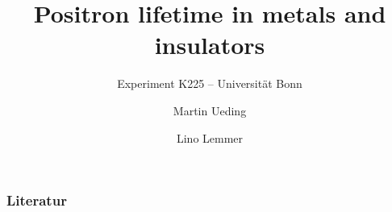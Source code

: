 \documentclass[english, fleqn]{beamer}
\title{Positron lifetime in metals and insulators}
\subtitle{Experiment K225 -- Universität Bonn}
\author{%
    Martin Ueding
    \and
    Lino Lemmer
}
\date{\daterange{2016-03-24}{2016-03-25}}
\begin{document}
\begin{frame}
    \titlepage
\end{frame}

\begin{frame}
    \frametitle{Literatur}

    \printbibliography
\end{frame}

\end{document}
